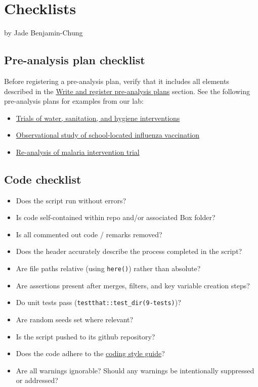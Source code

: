 \documentclass[
]{book}
\providecommand{\tightlist}{%
  \setlength{\itemsep}{0pt}\setlength{\parskip}{0pt}}
\begin{document}
\chapter{Checklists}\label{checklists}

by Jade Benjamin-Chung

\section{Pre-analysis plan checklist}\label{pre-analysis-plan-checklist}

Before registering a pre-analysis plan, verify that it includes all elements described in the \href{reproducibility.html\#write-and-register-pre-analysis-plans}{Write and register pre-analysis plans} section. See the following pre-analysis plans for examples from our lab:

\begin{itemize}
\tightlist
\item
  \href{https://osf.io/tprw2/}{Trials of water, sanitation, and hygiene interventions}
\item
  \href{https://osf.io/c8xuq/}{Observational study of school-located influenza vaccination}
\item
  \href{https://osf.io/rb3cw/}{Re-analysis of malaria intervention trial}
\end{itemize}

\section{Code checklist}\label{code-checklist}

\begin{itemize}
\tightlist
\item
  Does the script run without errors?
\item
  Is code self-contained within repo and/or associated Box folder?
\item
  Is all commented out code / remarks removed?
\item
  Does the header accurately describe the process completed in the script?
\item
  Are file paths relative (using \texttt{here()}) rather than absolute?
\item
  Are assertions present after merges, filters, and key variable creation steps?
\item
  Do unit tests pass (\texttt{testthat::test\_dir(\textquotesingle{}9-tests\textquotesingle{})})?
\item
  Are random seeds set where relevant?
\item
  Is the script pushed to its github repository?
\item
  Does the code adhere to the \href{https://jadebc.github.io/lab-manual/coding-style.html}{coding style guide}?
\item
  Are all warnings ignorable? Should any warnings be intentionally suppressed or addressed?
\end{itemize}
\end{document}
